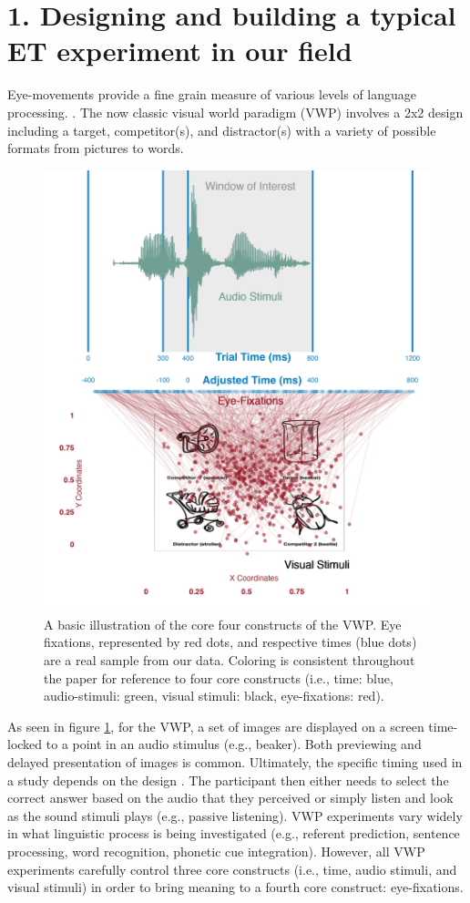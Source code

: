 \section{1. Designing and building a typical ET experiment in our field }
Eye-movements provide a fine grain measure of various levels of language processing.
\parencite[e.g.][]{Tanenhaus_Spivey-Knowlton_Eberhard_Sedivy_1995,Allopenna_1998}. The now classic visual world paradigm (VWP) involves a 2x2 design including a target, competitor(s), and distractor(s) with a variety of possible formats from pictures to words.

\begin{figure}[ht]
    \centering
    \includegraphics[height=.8\textwidth]{figures/Core_four_R.jpeg}
    \caption{A basic illustration of the core four constructs of the VWP. Eye fixations, represented by red dots, and respective times (blue dots) are a real sample from our data. Coloring is consistent throughout the paper for reference to four core constructs (i.e., time: blue, audio-stimuli: green, visual stimuli: black, eye-fixations: red). }
    \label{fig:core_four}
\end{figure}

As seen in figure \ref{fig:core_four}, for the VWP, a set of images are displayed on a screen time-locked to a point in an audio stimulus (e.g., beaker). Both previewing and delayed presentation of images is common. Ultimately, the specific timing used in a study depends on the design  \parencite[see,][, for a review]{Apfelbaum_Klein-Packard_McMurray_2021}{}{}.  The participant then either needs to select the correct answer based on the audio that they perceived or simply listen and look as the sound stimuli plays (e.g., passive listening). VWP experiments vary widely in what linguistic process is being investigated (e.g., referent prediction, sentence processing, word recognition, phonetic cue integration). However, all VWP experiments carefully control three core constructs (i.e., time, audio stimuli, and visual stimuli) in order to bring meaning to a fourth core construct: eye-fixations. 

